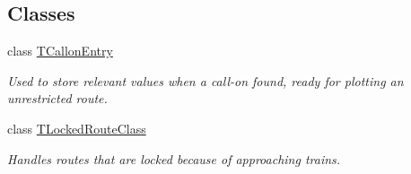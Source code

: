 \subsection*{Classes}
\begin{DoxyCompactItemize}
\item 
class \mbox{\hyperlink{class_t_all_routes_1_1_t_callon_entry}{T\+Callon\+Entry}}
\begin{DoxyCompactList}\small\item\em Used to store relevant values when a call-\/on found, ready for plotting an unrestricted route. \end{DoxyCompactList}\item 
class \mbox{\hyperlink{class_t_all_routes_1_1_t_locked_route_class}{T\+Locked\+Route\+Class}}
\begin{DoxyCompactList}\small\item\em Handles routes that are locked because of approaching trains. \end{DoxyCompactList}\end{DoxyCompactItemize}
